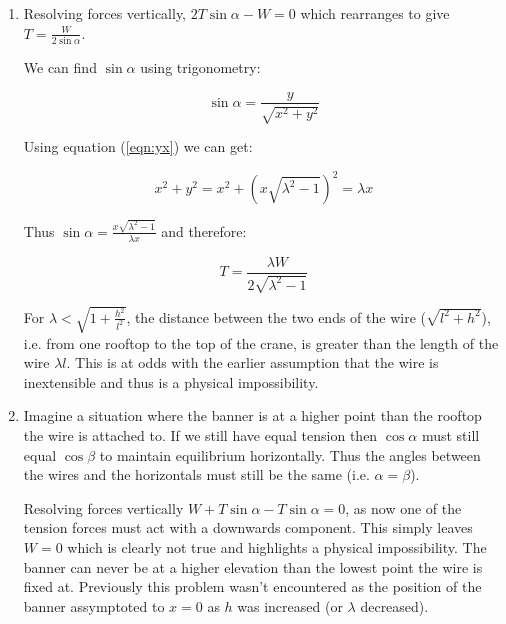 \begin{problem}
{\begin{enumerate}
	   As $\lambda$ goes to infinity,  $\sqrt{\lambda^2 -1}$ goes to $\lambda$ which is much greater than $h$, thus x goes to $\frac{l}{2}$, i.e. the banner sits half way between the buildings. At the same time $y$ goes to $\frac{\lambda l}{2}$, which means the banner hangs at half the height of the total length of wire. Both of these results correspond to the banner sitting directly in the middle of the wire.
	   
	   \item Resolving forces vertically, $2T\sin\alpha - W = 0$ which rearranges to give $T = \frac{W}{2\sin\alpha}$.
	   
	   We can find $\sin\alpha$ using trigonometry:
	   
	    \begin{equation*}	\sin\alpha = \frac{y}{\sqrt{x^2 + y^2}} \end{equation*}
	    
	    Using equation (\ref{eqn:yx}) we can get:
	    
	  \begin{equation*} x^2 + y^2 = x^2 + (x\sqrt{\lambda^2  -1})^2 = \lambda x \end{equation*}
	  
	  Thus $\sin\alpha = \frac{x\sqrt{\lambda^2  -1}}{\lambda x}$ and therefore:
	  
	  \begin{equation*} T = \frac{\lambda W}{2\sqrt{\lambda^2  -1}} \end{equation*}
	  
	  For $\lambda < \sqrt{1 + \frac{h^2}{l^2}}$, the distance between the two ends of the wire ($\sqrt{l^2 + h^2}$), i.e. from one rooftop to the top of the crane, is greater than the length of the wire $\lambda l$. This is at odds with the earlier assumption that the wire is inextensible and thus is a physical impossibility.
	  
	  \item Imagine a situation where the banner is at a higher point than the rooftop the wire is attached to. If we still have equal tension then $\cos\alpha$ must still equal $\cos\beta$ to maintain equilibrium horizontally. Thus the angles between the wires and the horizontals must still be the same (i.e. $\alpha = \beta$).
	  
	  Resolving forces vertically $W + T\sin\alpha - T\sin\alpha = 0$, as now one of the tension forces must act with a downwards component. This simply leaves $W = 0$ which is clearly not true and highlights a physical impossibility. The banner can never be at a higher elevation than the lowest point the wire is fixed at. Previously this problem wasn't encountered as the position of the banner assymptoted to $x = 0$ as $h$ was increased (or $\lambda$ decreased).
	  

\end{enumerate}}
\end{problem}
